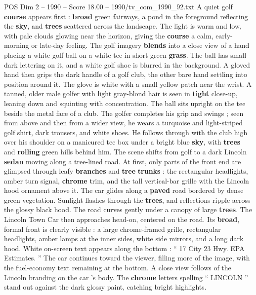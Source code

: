 \begin{textsample}{POS Dim 2 – 1990 – Score 18.00 – 1990/tv\_com\_1990\_92.txt}  \label{ex:f2_pos_038}
A quiet golf \textbf{course} appears first : \textbf{broad} green fairways, a pond in the foreground reflecting the \textbf{sky}, and \textbf{trees} scattered across the landscape.
The light is warm and low, with pale clouds glowing near the horizon, giving the \textbf{course} a calm, early-morning or late-day feeling.
The golf imagery \textbf{blends} into a close view of a hand placing a white golf ball on a white tee in short green \textbf{grass}.
The ball has small dark lettering on it, and a white golf shoe is blurred in the background.
A gloved hand then grips the dark handle of a golf club, the other bare hand settling into position around it.
The glove is white with a small yellow patch near the wrist.
A tanned, older male golfer with light gray-blond hair is seen in \textbf{tight} close-up, leaning down and squinting with concentration.
The ball sits upright on the tee beside the metal face of a club.
The golfer completes his grip and swings ; seen from above and then from a wider view, he wears a turquoise and light-striped golf shirt, dark trousers, and white shoes.
He follows through with the club high over his shoulder on a manicured tee box under a bright blue \textbf{sky}, with \textbf{trees} and \textbf{rolling} green hills behind him.
The scene shifts from golf to a dark Lincoln \textbf{sedan} moving along a tree-lined road.
At first, only parts of the front end are glimpsed through leafy \textbf{branches} and \textbf{tree} \textbf{trunks} : the rectangular headlights, amber turn signal, \textbf{chrome} trim, and the tall vertical-bar grille with the Lincoln hood ornament above it.
The car glides along a \textbf{paved} road bordered by dense green vegetation.
Sunlight flashes through the \textbf{trees}, and reflections ripple across the glossy black hood.
The road curves gently under a canopy of large \textbf{trees}.
The Lincoln Town Car then approaches head-on, centered on the road.
Its \textbf{broad}, formal front is clearly visible : a large chrome-framed grille, rectangular headlights, amber lamps at the inner sides, white side mirrors, and a long dark hood.
White on-screen text appears along the bottom : “ 17 City 23 Hwy.
EPA Estimates. ” The car continues toward the viewer, filling more of the image, with the fuel-economy text remaining at the bottom.
A close view follows of the Lincoln branding on the car ’s body.
The \textbf{chrome} letters spelling “ LINCOLN ” stand out against the dark glossy paint, catching bright highlights.

\end{textsample}
